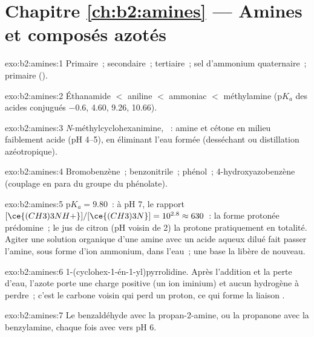 \section*{Chapitre \ref{ch:b2:amines} --- Amines et composés azotés}

\begin{solution}{exo:b2:amines:1}
Primaire~; secondaire~; tertiaire~; sel d'ammonium quaternaire~; primaire ().
\end{solution}

\begin{solution}{exo:b2:amines:2}
Éthanamide $<$ aniline $<$ ammoniac $<$ méthylamine ($\mathrm pK_a$ des acides conjugués
$-0.6$, 4.60, 9.26, 10.66).
\end{solution}

\begin{solution}{exo:b2:amines:3}
\textit{N}-méthylcyclohexanimine, ~: amine et cétone en milieu faiblement acide
(pH 4--5), en éliminant l'eau formée (desséchant ou distillation azéotropique).
\end{solution}

\begin{solution}{exo:b2:amines:4}
Bromobenzène~; benzonitrile~; phénol~; 4-hydroxyazobenzène  (couplage en para du
groupe  du phénolate).
\end{solution}

\begin{solution}{exo:b2:amines:5}
$\mathrm pK_a = 9.80$~: à pH 7, le rapport $[\ce{(CH3)3NH+}]/[\ce{(CH3)3N}] = 10^{2.8} \approx 630$~: la
forme protonée prédomine~; le jus de citron (pH voisin de 2) la protone pratiquement en totalité.
Agiter une solution organique d'une amine avec un acide aqueux dilué fait passer l'amine, sous
forme d'ion ammonium, dans l'eau~; une base la libère de nouveau.
\end{solution}

\begin{solution}{exo:b2:amines:6}
1-(cyclohex-1-én-1-yl)pyrrolidine. Après l'addition et la perte d'eau, l'azote porte une charge
positive (un ion iminium) et aucun hydrogène à perdre~; c'est le carbone voisin qui perd un
proton, ce qui forme la liaison .
\end{solution}

\begin{solution}{exo:b2:amines:7}
Le benzaldéhyde avec la propan-2-amine, ou la propanone avec la benzylamine, chaque fois avec
 vers pH 6.
\end{solution}

